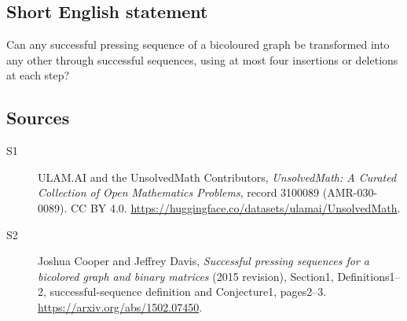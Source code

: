 \documentclass[11pt]{article}
\begin{document}
\subsection{Short English statement}
Can any successful pressing sequence of a bicoloured graph be transformed into any other through successful sequences, using at most four insertions or deletions at each step?
\subsection{Sources}
\begin{description}
\item[\hypertarget{source:3100089:1}{S1}] ULAM.AI and the UnsolvedMath Contributors, \emph{UnsolvedMath: A Curated Collection of Open Mathematics Problems}, record 3100089 (AMR-030-0089). CC BY 4.0. \url{https://huggingface.co/datasets/ulamai/UnsolvedMath}.
\item[\hypertarget{source:3100089:2}{S2}] Joshua Cooper and Jeffrey Davis, \emph{Successful pressing sequences for a bicolored graph and binary matrices} (2015 revision), Section1, Definitions1--2, successful-sequence definition and Conjecture1, pages2--3. \url{https://arxiv.org/abs/1502.07450}.
\end{description}
\label{end:3100089}
\end{document}
